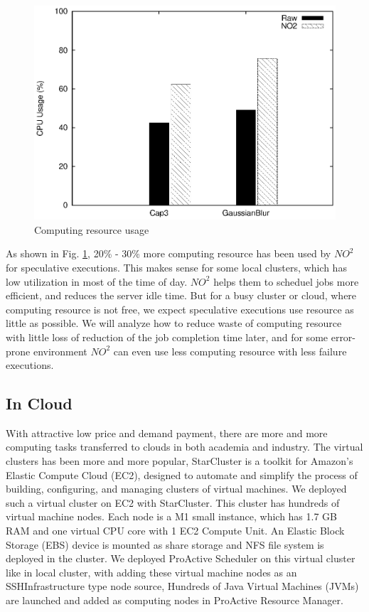 \begin{figure}
\centering
\includegraphics[width=0.9\columnwidth]{figures/resource_usage.eps}
\caption{Computing resource usage}
\label{figure:resourceusage}
\end{figure}

As shown in Fig. \ref{figure:resourceusage}, 20\% - 30\% more computing resource has been
used by $NO^2$ for speculative executions. This makes sense for some local clusters, which
has low utilization in most of the time of day. $NO^2$ helps them to scheduel jobs more
efficient, and reduces the server idle time. But for a busy cluster or cloud, where
computing resource is not free, we expect speculative executions use resource as little as
possible. We will analyze how to reduce waste of computing resource with little loss of
reduction of the job completion time later, and for some error-prone environment $NO^2$
can even use less computing resource with less failure executions.

\subsection{In Cloud}

With attractive low price and demand payment, there are more and more computing tasks
transferred to clouds in both academia and industry. The virtual clusters has been more
and more popular, StarCluster \cite{starcluster} is a toolkit for Amazon’s Elastic Compute
Cloud (EC2), designed to automate and simplify the process of building, configuring, and
managing clusters of virtual machines. We deployed such a virtual cluster on EC2 with
StarCluster. This cluster has hundreds of virtual machine nodes. Each node is a M1 small
instance, which has 1.7 GB RAM and one virtual CPU core with 1 EC2 Compute Unit. An
Elastic Block Storage (EBS) device is mounted as share storage and NFS file system is
deployed in the cluster. We deployed ProActive Scheduler on this virtual cluster like in
local cluster, with adding these virtual machine nodes as an SSHInfrastructure type node
source, Hundreds of Java Virtual Machines (JVMs) are launched and added as computing nodes
in ProActive Resource Manager.

